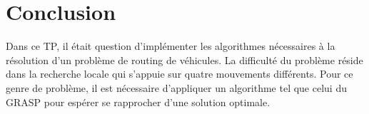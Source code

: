 \documentclass[12pt]{article}
\begin{document}
    \section{Conclusion}
    Dans ce TP, il était question d'implémenter les algorithmes nécessaires à la résolution d'un problème de routing de véhicules. La difficulté du problème réside dans la recherche locale qui s'appuie sur quatre mouvements différents. Pour ce genre de problème, il est nécessaire d'appliquer un algorithme tel que celui du GRASP pour espérer se rapprocher d'une solution optimale.
 
    \newpage	    
    
    
	\label{lastPage}
	    
	    
\end{document}
